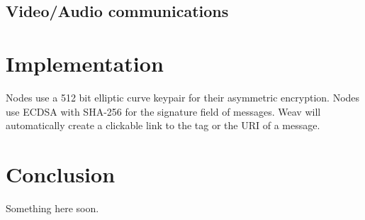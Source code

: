 \documentclass[10pt,a4paper,onecolumn]{article}
\begin{document}
\subsection*{Video/Audio communications}


\section{Implementation}
Nodes use a 512 bit elliptic curve keypair for their asymmetric encryption. Nodes use ECDSA with SHA-256 for the signature field of messages. Weav will automatically create a clickable link to the tag or the URI of a message.


\section{Conclusion}
Something here soon.

{}

\end{document}
